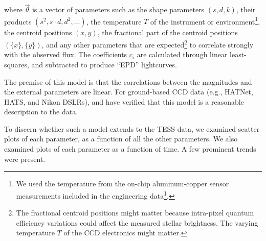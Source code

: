 \documentclass[12pt,twocolumn,tighten]{aastex62}
\begin{document}
where $\vec{\theta}$ is a vector of parameters such as the shape
parameters $(s,d,k)$, their products $(s^2, s\cdot d, d^2, \ldots)$,
the temperature $T$ of the instrument or environment\footnote{ We used
the temperature from the on-chip aluminum-copper sensor measurements
included in the engineering
data\footnote{\url{archive.stsci.edu/missions/tess/engineering/}}.  },
the centroid positions $(x,y)$, the fractional part of the
centroid positions $(\{x\},\{y\})$, and any other parameters that are
expected\footnote{ The fractional centroid positions might matter
because intra-pixel quantum efficiency variations could affect the
measured stellar brightness.  The varying temperature $T$ of the CCD
electronics might matter.  } to correlate strongly with the observed
flux.  The coefficients $c_i$ are calculated through linear
least-squares, and subtracted to produce ``EPD'' lightcurves.

The premise of this model is that the correlations between the
magnitudes and the external parameters are linear.  For ground-based
CCD data (e.g., HATNet, HATS, and Nikon DSLRs), \citet{bakos_2010} and
\citet{zhang_precision_2016} have verified that this model is a
reasonable description to the data.

To discern whether such a model extends to the TESS data, we examined
scatter plots of each parameter, as a function of all the other
parameters.  We also examined plots of each parameter as a function of
time.  A few prominent trends were present.
\end{document}
